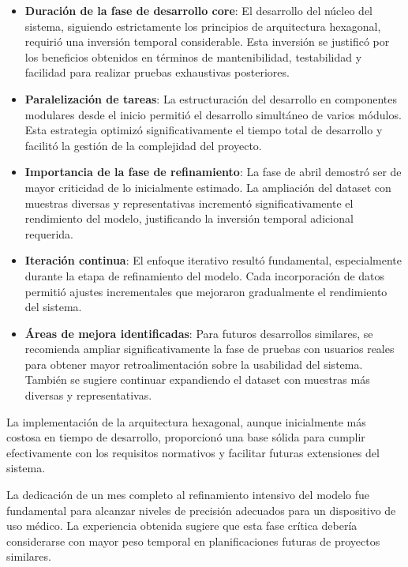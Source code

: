 \begin{itemize}
    \item \textbf{Duración de la fase de desarrollo core}: El desarrollo del núcleo del sistema, siguiendo estrictamente los principios de arquitectura hexagonal, requirió una inversión temporal considerable. Esta inversión se justificó por los beneficios obtenidos en términos de mantenibilidad, testabilidad y facilidad para realizar pruebas exhaustivas posteriores.
    
    \item \textbf{Paralelización de tareas}: La estructuración del desarrollo en componentes modulares desde el inicio permitió el desarrollo simultáneo de varios módulos. Esta estrategia optimizó significativamente el tiempo total de desarrollo y facilitó la gestión de la complejidad del proyecto.
    
    \item \textbf{Importancia de la fase de refinamiento}: La fase de abril demostró ser de mayor criticidad de lo inicialmente estimado. La ampliación del dataset con muestras diversas y representativas incrementó significativamente el rendimiento del modelo, justificando la inversión temporal adicional requerida.
    
    \item \textbf{Iteración continua}: El enfoque iterativo resultó fundamental, especialmente durante la etapa de refinamiento del modelo. Cada incorporación de datos permitió ajustes incrementales que mejoraron gradualmente el rendimiento del sistema.
    
    \item \textbf{Áreas de mejora identificadas}: Para futuros desarrollos similares, se recomienda ampliar significativamente la fase de pruebas con usuarios reales para obtener mayor retroalimentación sobre la usabilidad del sistema. También se sugiere continuar expandiendo el dataset con muestras más diversas y representativas.
\end{itemize}

La implementación de la arquitectura hexagonal, aunque inicialmente más costosa en tiempo de desarrollo, proporcionó una base sólida para cumplir efectivamente con los requisitos normativos y facilitar futuras extensiones del sistema.

La dedicación de un mes completo al refinamiento intensivo del modelo fue fundamental para alcanzar niveles de precisión adecuados para un dispositivo de uso médico. La experiencia obtenida sugiere que esta fase crítica debería considerarse con mayor peso temporal en planificaciones futuras de proyectos similares.
